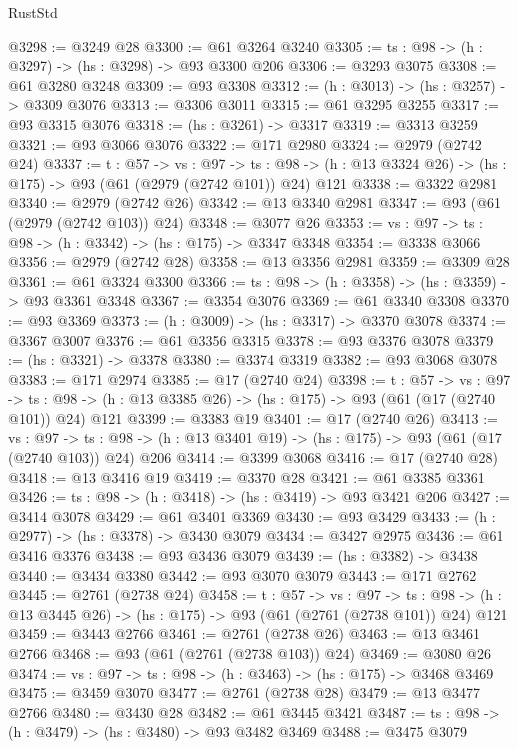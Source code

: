 \begin{lexlean}{RustStd}
\begin{coremodule}
@3298 := @3249 @28
@3300 := @61 @3264 @3240
@3305 := {ts : @98} -> (h : @3297) -> (hs : @3298) -> @93 @3300 @206
@3306 := @3293 @3075
@3308 := @61 @3280 @3248
@3309 := @93 @3308
@3312 := (h : @3013) -> (hs : @3257) -> @3309 @3076
@3313 := @3306 @3011
@3315 := @61 @3295 @3255
@3317 := @93 @3315 @3076
@3318 := (hs : @3261) -> @3317
@3319 := @3313 @3259
@3321 := @93 @3066 @3076
@3322 := @171 @2980
@3324 := @2979 (@2742 @24)
@3337 := {t : @57} ->
  {vs : @97} ->
  {ts : @98} -> (h : @13 @3324 @26) -> (hs : @175) -> @93 (@61 (@2979 (@2742 @101)) @24) @121
@3338 := @3322 @2981
@3340 := @2979 (@2742 @26)
@3342 := @13 @3340 @2981
@3347 := @93 (@61 (@2979 (@2742 @103)) @24)
@3348 := @3077 @26
@3353 := {vs : @97} -> {ts : @98} -> (h : @3342) -> (hs : @175) -> @3347 @3348
@3354 := @3338 @3066
@3356 := @2979 (@2742 @28)
@3358 := @13 @3356 @2981
@3359 := @3309 @28
@3361 := @61 @3324 @3300
@3366 := {ts : @98} -> (h : @3358) -> (hs : @3359) -> @93 @3361 @3348
@3367 := @3354 @3076
@3369 := @61 @3340 @3308
@3370 := @93 @3369
@3373 := (h : @3009) -> (hs : @3317) -> @3370 @3078
@3374 := @3367 @3007
@3376 := @61 @3356 @3315
@3378 := @93 @3376 @3078
@3379 := (hs : @3321) -> @3378
@3380 := @3374 @3319
@3382 := @93 @3068 @3078
@3383 := @171 @2974
@3385 := @17 (@2740 @24)
@3398 := {t : @57} ->
  {vs : @97} ->
  {ts : @98} -> (h : @13 @3385 @26) -> (hs : @175) -> @93 (@61 (@17 (@2740 @101)) @24) @121
@3399 := @3383 @19
@3401 := @17 (@2740 @26)
@3413 := {vs : @97} ->
  {ts : @98} -> (h : @13 @3401 @19) -> (hs : @175) -> @93 (@61 (@17 (@2740 @103)) @24) @206
@3414 := @3399 @3068
@3416 := @17 (@2740 @28)
@3418 := @13 @3416 @19
@3419 := @3370 @28
@3421 := @61 @3385 @3361
@3426 := {ts : @98} -> (h : @3418) -> (hs : @3419) -> @93 @3421 @206
@3427 := @3414 @3078
@3429 := @61 @3401 @3369
@3430 := @93 @3429
@3433 := (h : @2977) -> (hs : @3378) -> @3430 @3079
@3434 := @3427 @2975
@3436 := @61 @3416 @3376
@3438 := @93 @3436 @3079
@3439 := (hs : @3382) -> @3438
@3440 := @3434 @3380
@3442 := @93 @3070 @3079
@3443 := @171 @2762
@3445 := @2761 (@2738 @24)
@3458 := {t : @57} ->
  {vs : @97} ->
  {ts : @98} -> (h : @13 @3445 @26) -> (hs : @175) -> @93 (@61 (@2761 (@2738 @101)) @24) @121
@3459 := @3443 @2766
@3461 := @2761 (@2738 @26)
@3463 := @13 @3461 @2766
@3468 := @93 (@61 (@2761 (@2738 @103)) @24)
@3469 := @3080 @26
@3474 := {vs : @97} -> {ts : @98} -> (h : @3463) -> (hs : @175) -> @3468 @3469
@3475 := @3459 @3070
@3477 := @2761 (@2738 @28)
@3479 := @13 @3477 @2766
@3480 := @3430 @28
@3482 := @61 @3445 @3421
@3487 := {ts : @98} -> (h : @3479) -> (hs : @3480) -> @93 @3482 @3469
@3488 := @3475 @3079

\end{coremodule}
\end{lexlean}
